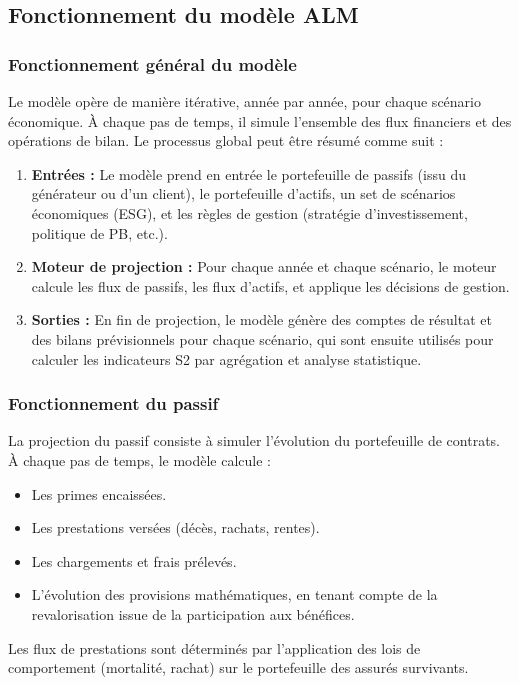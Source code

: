 \subsection{Fonctionnement du modèle ALM}

\subsubsection{Fonctionnement général du modèle}
Le modèle opère de manière itérative, année par année, pour chaque scénario économique. À chaque pas de temps, il simule l'ensemble des flux financiers et des opérations de bilan. Le processus global peut être résumé comme suit :
\begin{enumerate}
    \item \textbf{Entrées :} Le modèle prend en entrée le portefeuille de passifs (issu du générateur ou d'un client), le portefeuille d'actifs, un set de scénarios économiques (ESG), et les règles de gestion (stratégie d'investissement, politique de PB, etc.).
    \item \textbf{Moteur de projection :} Pour chaque année et chaque scénario, le moteur calcule les flux de passifs, les flux d'actifs, et applique les décisions de gestion.
    \item \textbf{Sorties :} En fin de projection, le modèle génère des comptes de résultat et des bilans prévisionnels pour chaque scénario, qui sont ensuite utilisés pour calculer les indicateurs S2 par agrégation et analyse statistique.
\end{enumerate}

\subsubsection{Fonctionnement du passif}
La projection du passif consiste à simuler l'évolution du portefeuille de contrats. À chaque pas de temps, le modèle calcule :
\begin{itemize}
    \item Les primes encaissées.
    \item Les prestations versées (décès, rachats, rentes).
    \item Les chargements et frais prélevés.
    \item L'évolution des provisions mathématiques, en tenant compte de la revalorisation issue de la participation aux bénéfices.
\end{itemize}
Les flux de prestations sont déterminés par l'application des lois de comportement (mortalité, rachat) sur le portefeuille des assurés survivants.

